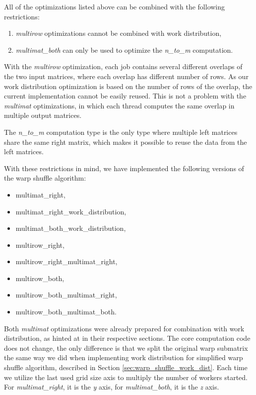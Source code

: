 All of the optimizations listed above can be combined with the following restrictions:

\begin{enumerate}
	\item \textit{multirow} optimizations cannot be combined with work distribution,
	\item \textit{multimat\_both} can only be used to optimize the \textit{n\_to\_m} computation. 
\end{enumerate}

With the \textit{multirow} optimization, each job contains several different overlaps of the two input matrices, where each overlap has different number of rows. As our work distribution optimization is based on the number of rows of the overlap, the current implementation cannot be easily reused. This is not a problem with the \textit{multimat} optimizations, in which each thread computes the same overlap in multiple output matrices.

The \textit{n\_to\_m} computation type is the only type where multiple left matrices share the same right matrix, which makes it possible to reuse the data from the left matrices.


With these restrictions in mind, we have implemented the following versions of the warp shuffle algorithm:

\begin{itemize}
	\item multimat\_right,
	\item multimat\_right\_work\_distribution,
	\item multimat\_both\_work\_distribution,
	\item multirow\_right,
	\item multirow\_right\_multimat\_right,
	\item multirow\_both,
	\item multirow\_both\_multimat\_right,
	\item multirow\_both\_multimat\_both.
\end{itemize}

Both \textit{multimat} optimizations were already prepared for combination with work distribution, as hinted at in their respective sections. The core computation code does not change, the only difference is that we split the original warp submatrix the same way we did when implementing work distribution for simplified warp shuffle algorithm, described in Section \ref{sec:warp_shuffle_work_dist}. Each time we utilize the last used grid size axis to multiply the number of workers started. For \textit{multimat\_right}, it is the \textit{y} axis, for \textit{multimat\_both}, it is the \textit{z} axis.

